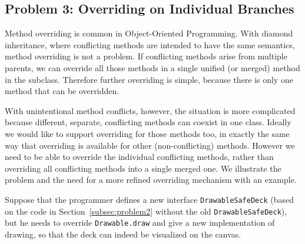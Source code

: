 \subsection{Problem 3: Overriding on Individual Branches}\label{subsec:partialoverrides}
Method overriding is common in Object-Oriented Programming. 
With diamond inheritance, where conflicting methods are intended to have 
the same semantics, method overriding is not a problem. If conflicting
methods arise from multiple parents, we can override all those methods 
in a single unified (or merged) method in the subclass. Therefore
further overriding is simple, because there is only one method that
can be overridden. 

With unintentional method conflicts, however, the situation is more
complicated because different, separate, conflicting methods can coexist
in one class. Ideally we would like to support overriding for those
methods too, in exactly the same way that overriding is available for 
other (non-conflicting) methods. However we need to be able to
override the individual conflicting methods, rather than overriding all
conflicting methods into a single merged one. We illustrate the
problem and the need for a more refined overriding mechanism with 
an example.

Suppose that the programmer defines a new interface \lstinline|DrawableSafeDeck| (based on the code in Section~\ref{subsec:problem2} without the old \lstinline|DrawableSafeDeck|), but he needs to override
\lstinline|Drawable.draw| and give a new implementation of drawing, so that the deck can indeed be visualized on the canvas.

